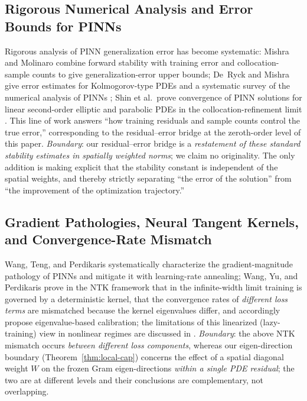 \documentclass[11pt]{article}
\newcommand{\W}{W}
\numberwithin{equation}{section}
\begin{document}
\subsection{Rigorous Numerical Analysis and Error Bounds for PINNs}\label{sec:rel-error}
Rigorous analysis of PINN generalization error has become systematic: Mishra and Molinaro \cite{MishraMolinaro2020} combine forward stability with training error and collocation-sample counts to give generalization-error upper bounds; De~Ryck and Mishra give error estimates for Kolmogorov-type PDEs and a systematic survey of the numerical analysis of PINNs \cite{DeRyckMishra2022,DeRyckMishra2024}; Shin et al.\ prove convergence of PINN solutions for linear second-order elliptic and parabolic PDEs in the collocation-refinement limit \cite{Shin2020}. This line of work answers ``how training residuals and sample counts control the true error,'' corresponding to the residual--error bridge at the zeroth-order level of this paper. \emph{Boundary}: our residual--error bridge is a \emph{restatement of these standard stability estimates in spatially weighted norms}; we claim no originality. The only addition is making explicit that the stability constant is independent of the spatial weights, and thereby strictly separating ``the error of the solution'' from ``the improvement of the optimization trajectory.''

\subsection{Gradient Pathologies, Neural Tangent Kernels, and Convergence-Rate Mismatch}\label{sec:rel-ntk}
Wang, Teng, and Perdikaris \cite{WangTeng2020} systematically characterize the gradient-magnitude pathology of PINNs and mitigate it with learning-rate annealing; Wang, Yu, and Perdikaris \cite{Wang2020NTK} prove in the NTK framework that in the infinite-width limit training is governed by a deterministic kernel, that the convergence rates of \emph{different loss terms} are mismatched because the kernel eigenvalues differ, and accordingly propose eigenvalue-based calibration; the limitations of this linearized (lazy-training) view in nonlinear regimes are discussed in \cite{Bonfanti2024}. \emph{Boundary}: the above NTK mismatch occurs \emph{between different loss components}, whereas our eigen-direction boundary (Theorem~\ref{thm:local-cap}) concerns the effect of a spatial diagonal weight $\W$ on the frozen Gram eigen-directions \emph{within a single PDE residual}; the two are at different levels and their conclusions are complementary, not overlapping.
\end{document}
